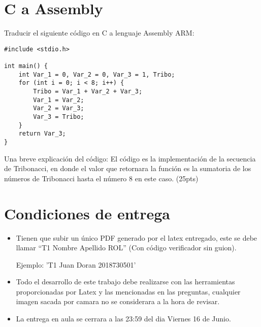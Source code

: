 \documentclass[spanish, fleqn, oneside]{article}
\begin{document}
\newpage
\section{C a Assembly}

Traducir el siguiente código en C a lenguaje Assembly ARM: 

\begin{verbatim}
#include <stdio.h>

int main() {
    int Var_1 = 0, Var_2 = 0, Var_3 = 1, Tribo;
    for (int i = 0; i < 8; i++) {
        Tribo = Var_1 + Var_2 + Var_3;
        Var_1 = Var_2;
        Var_2 = Var_3;
        Var_3 = Tribo;
    }
    return Var_3;
}
\end{verbatim}
Una breve explicación del código: El código es la implementación de la secuencia de Tribonacci, en donde el valor que retornara la función es la sumatoria de los números de Tribonacci hasta el número 8 en este caso.
(25pts)

\newpage
\section{Condiciones de entrega}
\begin{itemize}
    \item Tienen que subir un único PDF generado por el latex entregado, este se debe llamar “T1 Nombre Apellido ROL” (Con código verificador sin guion).
    
    Ejemplo: ’T1 Juan Doran 2018730501’
    
    \item 
    Todo el desarrollo de este trabajo debe realizarse con las herramientas proporcionadas por Latex y las mencionadas en las preguntas, cualquier imagen
    sacada por camara no se considerara a la hora de revisar.

    \item La entrega en aula se cerrara a las 23:59 del dia Viernes 16 de Junio.
\end{itemize}
\end{document}
